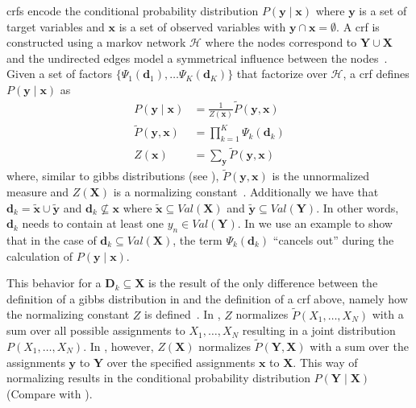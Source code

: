 \bigskip

\Glspl{crf} encode the \gls{conditional probability distribution} $P(\mathbf{y}\mid\mathbf{x})$ where $\mathbf{y}$ is a set of \glspl{target variable} and $\mathbf{x}$ is a set of \glspl{observed variable} with $\mathbf{y}\cap\mathbf{x}=\emptyset$.
A \gls{crf} is constructed using a \gls{markov network} $\mathcal{H}$ where the nodes correspond to $\mathbf{Y}\cup\mathbf{X}$ and the undirected edges model a symmetrical influence between the nodes~\citep{koller2009probabilistic}.
Given a set of \glspl{factor} $\{\Psi_1(\mathbf{d}_1),\dots\Psi_K(\mathbf{d}_K)\}$ that factorize over $\mathcal{H}$, a \gls{crf} defines $P(\mathbf{y}\mid\mathbf{x})$ as~\citep{koller2009probabilistic}
\begin{equation}
  \label{equ:crf-factor}
  \begin{split}
    P(\mathbf{y}\mid\mathbf{x}) & = \frac{1}{Z(\mathbf{x})}\tilde{P}(\mathbf{y},\mathbf{x}) \\
    \tilde{P}(\mathbf{y},\mathbf{x}) &= \prod_{k=1}^{K}\Psi_k\left(\mathbf{d}_k\right) \\
    Z(\mathbf{x}) & = \sum_{\mathbf{y}}\tilde{P}(\mathbf{y},\mathbf{x})
  \end{split}
\end{equation}
where, similar to \glspl{gibbs distribution} (see ), $\tilde{P}(\mathbf{y},\mathbf{x})$ is the unnormalized measure and $Z(\mathbf{X})$ is a normalizing constant~\citep{koller2009probabilistic}.
Additionally we have that $\mathbf{d}_k=\mathbf{\tilde{x}}\cup\mathbf{\tilde{y}}$ and $\mathbf{d}_k\not\subseteq\mathbf{x}$ where $\mathbf{\tilde{x}}\subseteq Val(\mathbf{X})$ and $\mathbf{\tilde{y}}\subseteq Val(\mathbf{Y})$.
In other words, $\mathbf{d}_k$ needs to contain at least one $y_n\in Val(\mathbf{Y})$.
In  we use an example to show that in the case of $\mathbf{d}_k\subseteq Val(\mathbf{X})$, the term $\Psi_k(\mathbf{d}_k)$ ``cancels out'' during the calculation of $P(\mathbf{y}\mid\mathbf{x})$.

This behavior for a $\mathbf{D}_k\subseteq\mathbf{X}$ is the result of the only difference between the definition of a \gls{gibbs distribution} in  and the definition of a \gls{crf} above, namely how the normalizing constant $Z$ is defined~\citep{koller2009probabilistic}.
In , $Z$ normalizes $\tilde{P}(X_1,\dots,X_N)$ with a sum over all possible assignments to $X_1,\dots,X_N$ resulting in a \gls{joint distribution} $P(X_1,\dots,X_N)$.
In , however, $Z(\mathbf{X})$ normalizes $\tilde{P}(\mathbf{Y},\mathbf{X})$ with a sum over the assignments $\mathbf{y}$ to $\mathbf{Y}$ over the specified assignments $\mathbf{x}$ to $\mathbf{X}$.
This way of normalizing results in the \gls{conditional probability distribution} $P(\mathbf{Y}\mid\mathbf{X})$ (Compare with ).

